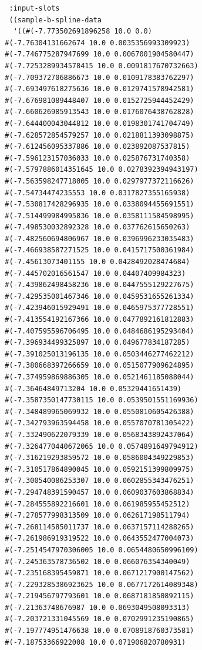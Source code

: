 \documentclass [11pt]{book}
\begin{document}
\begin{itemize}
\begin{figure}
\begin{lrbox}{\boxedverb}
\begin{minipage}{\linewidth}
{\begin{verbatim}
   :input-slots 
   ((sample-b-spline-data
    '((#(-7.773502691896258 10.0 0.0)
  #(-7.76304131662674 10.0 0.0035356993309923)
  #(-7.746775287947699 10.0 0.0067001904580447)
  #(-7.7253289934578415 10.0 0.0091817670732663)
  #(-7.709372706886673 10.0 0.0109178383762297)
  #(-7.693497618275636 10.0 0.0129741578942581)
  #(-7.676981089448407 10.0 0.0152725944452429)
  #(-7.660626985913543 10.0 0.0176076438762828)
  #(-7.644400043044812 10.0 0.0198301741704749)
  #(-7.628572854579257 10.0 0.0218811393098875)
  #(-7.612456095337886 10.0 0.023892087537815)
  #(-7.596123157036033 10.0 0.025876731740358)
  #(-7.5797886014351645 10.0 0.0278392394943197)
  #(-7.563598247718005 10.0 0.0297977372116626)
  #(-7.54734474235553 10.0 0.0317827355165938)
  #(-7.530817428296935 10.0 0.0338094455691551)
  #(-7.514499984995836 10.0 0.0358111584598995)
  #(-7.498530032892328 10.0 0.037762615650263)
  #(-7.482560694806967 10.0 0.0396996233035483)
  #(-7.466938587271525 10.0 0.0415717500361984)
  #(-7.45613073401155 10.0 0.0428492028474684)
  #(-7.445702016561547 10.0 0.04407409984323)
  #(-7.439862498458236 10.0 0.0447555129227675)
  #(-7.429535001467346 10.0 0.0459531655261334)
  #(-7.423946015929491 10.0 0.0465975377728551)
  #(-7.413554192167366 10.0 0.0477892161812883)
  #(-7.407595596706495 10.0 0.0484686195293404)
  #(-7.396934499325897 10.0 0.049677834187285)
  #(-7.391025013196135 10.0 0.0503446277462212)
  #(-7.380668397266659 10.0 0.0515077909624895)
  #(-7.374959869886305 10.0 0.0521461185088044)
  #(-7.36464849713204 10.0 0.05329441651439)
  #(-7.3587350147730115 10.0 0.0539501551169936)
  #(-7.348489965069932 10.0 0.0550810605426388)
  #(-7.342793963594458 10.0 0.0557070781305422)
  #(-7.332490622079339 10.0 0.0568343892437064)
  #(-7.3264770440672065 10.0 0.0574891649794912)
  #(-7.316219293859572 10.0 0.0586004349229853)
  #(-7.310517864890045 10.0 0.0592151399809975)
  #(-7.300540086253307 10.0 0.0602855343476251)
  #(-7.294748391590457 10.0 0.0609037603868834)
  #(-7.284555892216601 10.0 0.061985955452512)
  #(-7.278577998313509 10.0 0.062617198511794)
  #(-7.268114585011737 10.0 0.0637157114288265)
  #(-7.261986919319522 10.0 0.0643552477004073)
  #(-7.2514547970306005 10.0 0.0654480650996109)
  #(-7.245363578736502 10.0 0.066076354340049)
  #(-7.235168395459871 10.0 0.0671217900147562)
  #(-7.2293285386923625 10.0 0.0677172614089348)
  #(-7.219456797793601 10.0 0.0687181850892115)
  #(-7.21363748676987 10.0 0.0693049508093313)
  #(-7.203721331045569 10.0 0.0702991235190865)
  #(-7.197774951476638 10.0 0.0708918760373581)
  #(-7.18753366922008 10.0 0.071906820780931)

\end{verbatim}}
\end{minipage}
\end{lrbox}
\end{figure}
\end{itemize}
\end{document}
